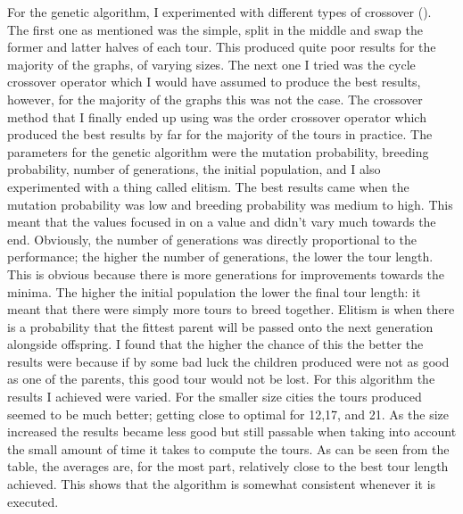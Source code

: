 \documentclass{article}
\begin{document}
For the genetic algorithm, I experimented with different types of crossover (\cite{crossover}). The first one as mentioned was the simple, split in the middle and swap the former and latter halves of each tour. This produced quite poor results for the majority of the graphs, of varying sizes. The next one I tried was the cycle crossover operator which I would have assumed to produce the best results, however, for the majority of the graphs this was not the case. The crossover method that I finally ended up using was the order crossover operator which produced the best results by far for the majority of the tours in practice. The parameters for the genetic algorithm were the mutation probability, breeding probability, number of generations, the initial population, and I also experimented with a thing called elitism. The best results came when the mutation probability was low and breeding probability was medium to high. This meant that the values focused in on a value and didn't vary much towards the end. Obviously, the number of generations was directly proportional to the performance; the higher the number of generations, the lower the tour length. This is obvious because there is more generations for improvements towards the minima. The higher the initial population the lower the final tour length: it meant that there were simply more tours to breed together. Elitism is when there is a probability that the fittest parent will be passed onto the next generation alongside offspring. I found that the higher the chance of this the better the results were because if by some bad luck the children produced were not as good as one of the parents, this good tour would not be lost. For this algorithm the results I achieved were varied. For the smaller size cities the tours produced seemed to be much better; getting close to optimal for 12,17, and 21. As the size increased the results became less good but still passable when taking into account the small amount of time it takes to compute the tours. As can be seen from the table, the averages are, for the most part, relatively close to the best tour length achieved. This shows that the algorithm is somewhat consistent whenever it is executed.\\\\
\end{document}
